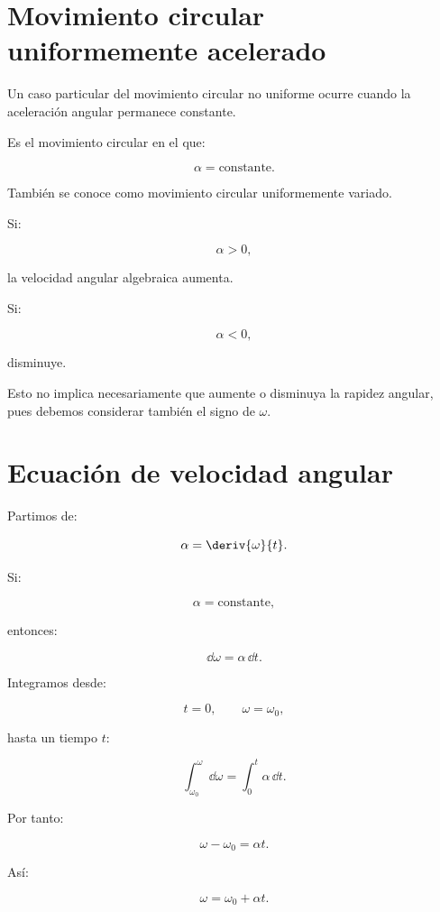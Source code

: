 \section{Movimiento circular uniformemente acelerado}

Un caso particular del movimiento circular no uniforme ocurre cuando la
aceleración angular permanece constante.

\begin{definicion}

Es el movimiento circular en el que:

\[
\boxed{
\alpha=\text{constante}
}.
\]

\end{definicion}

También se conoce como movimiento circular uniformemente variado.

Si:

\[
\alpha>0,
\]

la velocidad angular algebraica aumenta.

Si:

\[
\alpha<0,
\]

disminuye.

Esto no implica necesariamente que aumente o disminuya la rapidez angular,
pues debemos considerar también el signo de \(\omega\).


\section{Ecuación de velocidad angular}

Partimos de:

\[
\alpha=\deriv{\omega}{t}.
\]

Si:

\[
\alpha=\text{constante},
\]

entonces:

\[
\dd\omega=\alpha\,\dd t.
\]

Integramos desde:

\[
t=0,
\qquad
\omega=\omega_0,
\]

hasta un tiempo \(t\):

\[
\int_{\omega_0}^{\omega}\dd\omega
=
\int_0^t\alpha\,\dd t.
\]

Por tanto:

\[
\omega-\omega_0=\alpha t.
\]

Así:

\[
\boxed{
\omega=\omega_0+\alpha t
}.
\]

